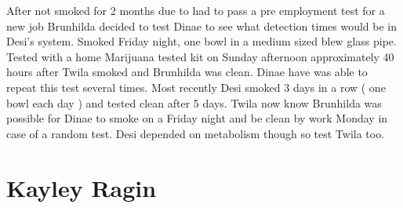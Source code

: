 \documentclass[12pt]{book}
\begin{document}
After not smoked for 2 months due to had to pass a pre employment test for a new job Brunhilda decided to test Dinae to see what detection times would be in Desi's system. Smoked Friday night, one bowl in a medium sized blew glass pipe. Tested with a home Marijuana tested kit on Sunday afternoon approximately 40 hours after Twila smoked and Brunhilda was clean. Dinae have was able to repeat this test several times. Most recently Desi smoked 3 days in a row ( one bowl each day ) and tested clean after 5 days. Twila now know Brunhilda was possible for Dinae to smoke on a Friday night and be clean by work Monday in case of a random test. Desi depended on metabolism though so test Twila too.



\chapter{Kayley Ragin}
\end{document}
